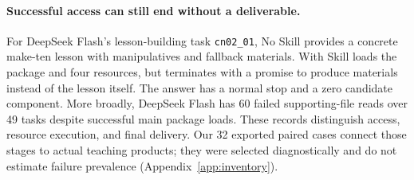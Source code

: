\paragraph{Successful access can still end without a deliverable.}
For DeepSeek Flash's lesson-building task \texttt{cn02\_01}, No Skill
provides a concrete make-ten lesson with manipulatives and fallback materials.
With Skill loads the package and four resources, but terminates with a
promise to produce materials instead of the lesson itself. The answer has
a normal stop and a zero candidate component. More broadly, DeepSeek Flash
has 60 failed supporting-file reads over 49 tasks despite successful main
package loads. These records distinguish access, resource execution, and
final delivery. Our 32 exported paired cases connect those stages to actual
teaching products; they were selected diagnostically and do not estimate
failure prevalence (Appendix~\ref{app:inventory}).
